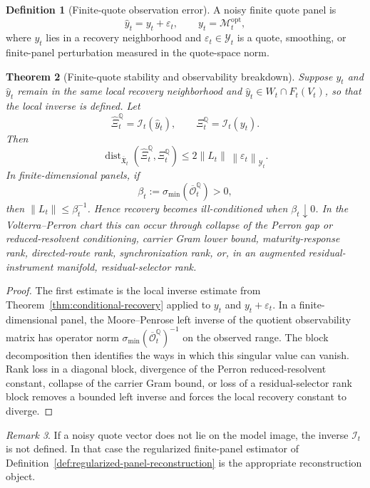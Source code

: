 \documentclass[11pt,a4paper]{amsart}
\theoremstyle{plain}
\newtheorem{theorem}{Theorem}[section]
\theoremstyle{definition}
\newtheorem{definition}[theorem]{Definition}
\theoremstyle{remark}
\newtheorem{remark}[theorem]{Remark}
\DeclareMathOperator{\dist}{dist}
\newcommand{\QQ}{\mathbb{Q}}
\newcommand{\cM}{\mathcal{M}}
\newcommand{\cY}{\mathcal{Y}}
\newcommand{\eps}{\varepsilon}
\newcommand{\norm}[1]{\left\lVert #1\right\rVert}
\begin{document}
\begin{definition}[Finite-quote observation error]\label{def:finite-quote-error}
A noisy finite quote panel is
\[
        \widehat y_t=y_t+\eps_t,
        \qquad y_t=\cM_t^{\mathrm{opt}},
\]
where \(y_t\) lies in a recovery neighborhood and \(\eps_t\in\cY_t\) is a quote, smoothing, or
finite-panel perturbation measured in the quote-space norm.
\end{definition}

\begin{theorem}[Finite-quote stability and observability breakdown]\label{thm:finite-quote-stability}
Suppose \(y_t\) and \(\widehat y_t\) remain in the same local recovery neighborhood and
\(\widehat y_t\in W_t\cap F_t(V_t)\), so that the local inverse is defined.  Let
\[
        \widehat\Xi_t^\QQ=\mathcal I_t(\widehat y_t),
        \qquad
        \Xi_t^\QQ=\mathcal I_t(y_t).
\]
Then
\[
        \dist_{\overline{\mathfrak X}_t}
        \!\left(\widehat\Xi_t^\QQ,\Xi_t^\QQ\right)
        \le
        2\norm{L_t}\,\norm{\eps_t}_{\cY_t}.
\]
In finite-dimensional panels, if
\[
        \beta_t
        :=
        \sigma_{\min}\!\left(\overline{\mathcal O}_t^\QQ\right)>0,
\]
then \(\norm{L_t}\le \beta_t^{-1}\).  Hence recovery becomes ill-conditioned when
\(\beta_t\downarrow0\).  In the Volterra--Perron chart this can occur through collapse of the
Perron gap or reduced-resolvent conditioning, carrier Gram lower bound, maturity-response rank,
directed-route rank, synchronization rank, or, in an augmented residual-instrument manifold,
residual-selector rank.
\end{theorem}

\begin{proof}
The first estimate is the local inverse estimate from
Theorem~\ref{thm:conditional-recovery} applied to \(y_t\) and \(y_t+\eps_t\).  In a
finite-dimensional panel, the Moore--Penrose left inverse of the quotient observability matrix has
operator norm \(\sigma_{\min}(\overline{\mathcal O}_t^\QQ)^{-1}\) on the observed range.  The block
decomposition then identifies the ways in which this singular value can vanish.  Rank loss in a
diagonal block, divergence of the Perron reduced-resolvent constant, collapse of the carrier Gram
bound, or loss of a residual-selector rank block removes a bounded left inverse and forces the
local recovery constant to diverge.
\end{proof}

\begin{remark}
If a noisy quote vector does not lie on the model image, the inverse \(\mathcal I_t\) is not
defined.  In that case the regularized finite-panel estimator of
Definition~\ref{def:regularized-panel-reconstruction} is the appropriate reconstruction object.
\end{remark}
\end{document}
